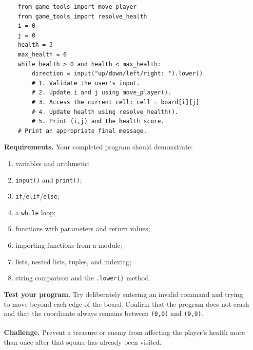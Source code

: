 \documentclass{article}
\begin{document}
\begin{verbatim}
	from game_tools import move_player
	from game_tools import resolve_health
	i = 0
	j = 0
	health = 3
	max_health = 6
	while health > 0 and health < max_health:
	    direction = input("up/down/left/right: ").lower()
		# 1. Validate the user's input.
		# 2. Update i and j using move_player().
		# 3. Access the current cell: cell = board[i][j]
		# 4. Update health using resolve_health().
		# 5. Print (i,j) and the health score.
	# Print an appropriate final message.
\end{verbatim}
\noindent
\textbf{Requirements.} Your completed program should demonstrate:

\begin{enumerate}[leftmargin=*,itemsep=1pt]
\item variables and arithmetic;
\item \texttt{input()} and \texttt{print()};
\item \texttt{if}/\texttt{elif}/\texttt{else};
\item a \texttt{while} loop;
\item functions with parameters and return values;
\item importing functions from a module;
\item lists, nested lists, tuples, and indexing;
\item string comparison and the \texttt{.lower()} method.
\end{enumerate} \vspace{0.5cm}
\noindent
\textbf{Test your program.} Try deliberately entering an invalid command and trying to move beyond each edge of the board. Confirm that the program does not crash and that the coordinate always remains between \texttt{(0,0)} and \texttt{(9,9)}. \\ \\
\noindent
\textbf{Challenge.}
Prevent a treasure or enemy from affecting the player's health more than once after that square has already been visited.
\end{document}
